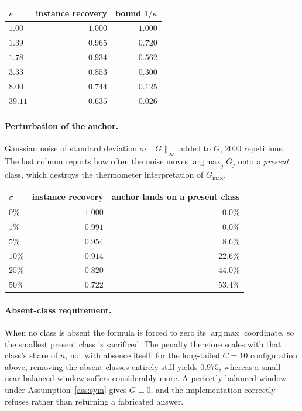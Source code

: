 \documentclass[11pt]{article}
\theoremstyle{remark}
\DeclareMathOperator*{\argmax}{arg\,max}
\begin{document}
\begin{center}
\begin{tabular}{lrr}
\toprule
$\kappa$ & instance recovery & bound $1/\kappa$ \\
\midrule
$1.00$  & $1.000$ & $1.000$ \\
$1.39$  & $0.965$ & $0.720$ \\
$1.78$  & $0.934$ & $0.562$ \\
$3.33$  & $0.853$ & $0.300$ \\
$8.00$  & $0.744$ & $0.125$ \\
$39.11$ & $0.635$ & $0.026$ \\
\bottomrule
\end{tabular}
\end{center}

\paragraph{Perturbation of the anchor.} Gaussian noise of standard deviation
$\sigma\cdot\|G\|_\infty$ added to $G$, $2000$ repetitions. The last column
reports how often the noise moves $\argmax_j G_j$ onto a \emph{present}
class, which destroys the thermometer interpretation of $G_{\max}$.

\begin{center}
\begin{tabular}{lrr}
\toprule
$\sigma$ & instance recovery & anchor lands on a present class \\
\midrule
$0\%$  & $1.000$ & $0.0\%$ \\
$1\%$  & $0.991$ & $0.0\%$ \\
$5\%$  & $0.954$ & $8.6\%$ \\
$10\%$ & $0.914$ & $22.6\%$ \\
$25\%$ & $0.820$ & $44.0\%$ \\
$50\%$ & $0.722$ & $53.4\%$ \\
\bottomrule
\end{tabular}
\end{center}

\paragraph{Absent-class requirement.} When no class is absent the formula is
forced to zero its $\argmax$ coordinate, so the smallest present class is
sacrificed. The penalty therefore scales with that class's share of $n$, not
with absence itself: for the long-tailed $C=10$ configuration above, removing
the absent classes entirely still yields $0.975$, whereas a small
near-balanced window suffers considerably more. A perfectly balanced window
under Assumption~\ref{ass:sym} gives $G \equiv 0$, and the implementation
correctly refuses rather than returning a fabricated answer.
\end{document}
